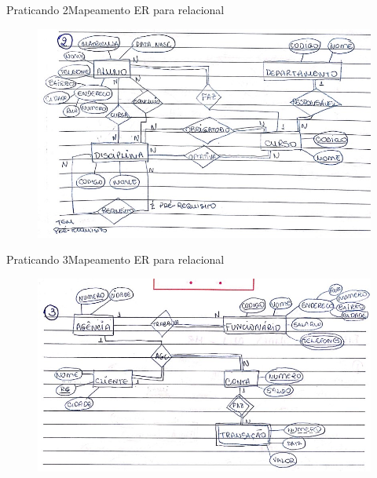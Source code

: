 \documentclass[t]{beamer}
\begin{document}

\begin{ftst}{Praticando 2}{Mapeamento ER para relacional}

\begin{figure}
    \centering
    \includegraphics[scale=0.5]{Praticando_figuras/2.jpg}
\end{figure}
\end{ftst}


\begin{ftst}{Praticando 3}{Mapeamento ER para relacional}

\begin{figure}
    \centering
    \includegraphics[scale=0.5]{Praticando_figuras/3.jpg}
\end{figure}
\end{ftst}

\end{document}
